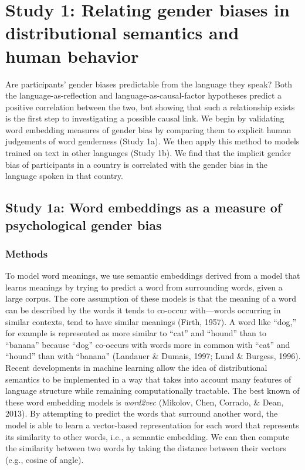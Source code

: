 \documentclass[9pt,twocolumn,twoside,lineno]{pnas-new}
\begin{document}
\section*{Study 1: Relating gender biases in distributional semantics and
human
behavior}\label{study-1-relating-gender-biases-in-distributional-semantics-and-human-behavior}

Are participants' gender biases predictable from the language they
speak? Both the language-as-reflection and language-as-causal-factor
hypotheses predict a positive correlation between the two, but showing
that such a relationship exists is the first step to investigating a
possible causal link. We begin by validating word embedding measures of
gender bias by comparing them to explicit human judgements of word
genderness (Study 1a). We then apply this method to models trained on
text in other languages (Study 1b). We find that the implicit gender
bias of participants in a country is correlated with the gender bias in
the language spoken in that country.

\subsection*{Study 1a: Word embeddings as a measure of psychological
gender
bias}\label{study-1a-word-embeddings-as-a-measure-of-psychological-gender-bias}

\subsubsection*{Methods}\label{methods}

To model word meanings, we use semantic embeddings derived from a model
that learns meanings by trying to predict a word from surrounding words,
given a large corpus. The core assumption of these models is that the
meaning of a word can be described by the words it tends to co-occur
with---words occurring in similar contexts, tend to have similar
meanings (Firth, 1957). A word like \enquote{dog,} for example is
represented as more similar to \enquote{cat} and \enquote{hound} than to
\enquote{banana} because \enquote{dog} co-occurs with words more in
common with \enquote{cat} and \enquote{hound} than with \enquote{banana}
(Landauer \& Dumais, 1997; Lund \& Burgess, 1996). Recent developments
in machine learning allow the idea of distributional semantics to be
implemented in a way that takes into account many features of language
structure while remaining computationally tractable. The best known of
these word embedding models is \emph{word2vec} (Mikolov, Chen, Corrado,
\& Dean, 2013). By attempting to predict the words that surround another
word, the model is able to learn a vector-based representation for each
word that represents its similarity to other words, i.e., a semantic
embedding. We can then compute the similarity between two words by
taking the distance between their vectors (e.g., cosine of angle).
\end{document}
